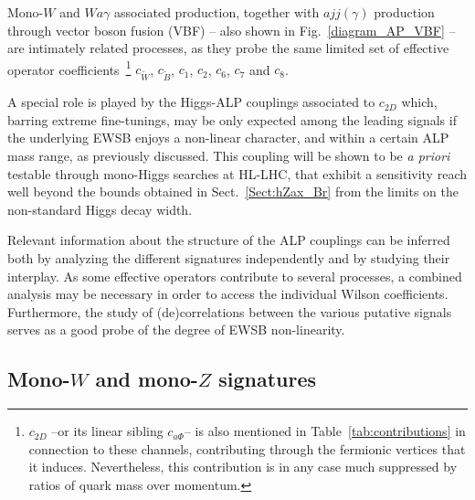 \documentclass[11pt]{article}
\newcommand{\g}{\gamma}
\renewcommand{\[}{\begin{equation}}
\renewcommand{\]}{\end{equation}}
\newcounter{diagram}
\begin{document}
Mono-$W$ and $Wa\g$ associated production, together 
with $ajj(\gamma)$ production through vector boson fusion (VBF) -- also shown in Fig.~\ref{diagram_AP_VBF} -- are intimately related processes, 
as they probe the same limited set of effective operator coefficients~\footnote{\label{footnote_c2D}$c_{2D}$ --or its linear sibling {$c_{a\Phi}$}-- is 
also mentioned in Table~\ref{tab:contributions} in connection to these channels, contributing through the fermionic vertices that it induces. Nevertheless, 
this contribution is in any case much suppressed by ratios of quark mass over momentum.
} $c_{\tilde{W}}$, $c_{\tilde{B}}$, $c_1$, $c_2$, $c_6$, $c_7$ and $c_8$. 

A special role 
is played by the Higgs-ALP couplings associated to $c_{2D}$ which, barring extreme fine-tunings, may be only expected among the leading signals 
if the underlying EWSB enjoys a non-linear character,  and within a certain ALP mass range, as previously discussed. 
This coupling will be shown to be {\it a priori}  testable through mono-Higgs searches at HL-LHC, that exhibit a sensitivity reach well 
beyond the bounds obtained  in Sect.~\ref{Sect:hZax_Br} from the limits on the non-standard Higgs decay width.


 Relevant information about the structure of the ALP couplings can be inferred both by analyzing the different signatures independently and by 
studying their interplay. As some effective operators contribute to several processes, a combined analysis may be necessary in order 
to access the individual Wilson coefficients. Furthermore, the study of (de)correlations between the various putative signals serves as a 
good probe of the degree of EWSB non-linearity.



\subsection[Mono-$W$ and mono-$Z$ signatures]{Mono-$W$ and mono-$Z$ signatures} 
\label{Sect:monoWZ_Future}
\end{document}
